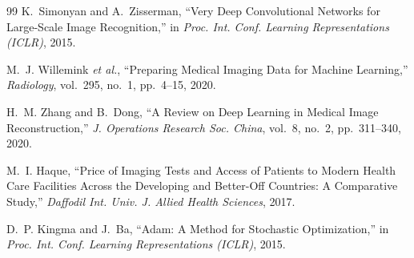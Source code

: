\documentclass[10pt,a4paper,twocolumn,english]{article}
\begin{document}
\begin{thebibliography}{99}
K.~Simonyan and A.~Zisserman, ``Very Deep Convolutional Networks for Large-Scale Image Recognition,'' in \textit{Proc. Int. Conf. Learning Representations (ICLR)}, 2015.

M.~J. Willemink \textit{et al.}, ``Preparing Medical Imaging Data for Machine Learning,'' \textit{Radiology}, vol.~295, no.~1, pp.~4--15, 2020.

H.~M. Zhang and B.~Dong, ``A Review on Deep Learning in Medical Image Reconstruction,'' \textit{J. Operations Research Soc. China}, vol.~8, no.~2, pp.~311--340, 2020.

M.~I. Haque, ``Price of Imaging Tests and Access of Patients to Modern Health Care Facilities Across the Developing and Better-Off Countries: A Comparative Study,'' \textit{Daffodil Int. Univ. J. Allied Health Sciences}, 2017.

D.~P. Kingma and J.~Ba, ``Adam: A Method for Stochastic Optimization,'' in \textit{Proc. Int. Conf. Learning Representations (ICLR)}, 2015.

\end{thebibliography}
\end{document}
